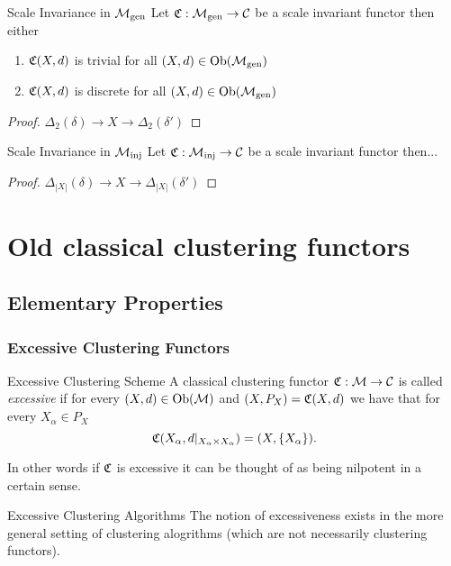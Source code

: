 \begin{proposition}{Scale Invariance in ${\mathcal{M}_\mathrm{gen}}$}{}
    Let $\mathfrak{C}: {\mathcal{M}_\mathrm{gen}} \to \mathcal{C}$ be a scale invariant functor then either
    \begin{enumerate}
        \item $\mathfrak{C}(X,d)$ is trivial for all $(X,d) \in \mathrm {Ob}({\mathcal{M}_\mathrm{gen}})$
        \item $\mathfrak{C}(X,d)$ is discrete for all $(X,d) \in \mathrm {Ob}({\mathcal{M}_\mathrm{gen}})$
    \end{enumerate}
\end{proposition}

\begin{proof}
    $\Delta_2(\delta) \to X \to \Delta_2(\delta')$
\end{proof}

\begin{proposition}{Scale Invariance in ${\mathcal{M}_\mathrm{inj}}$}{}
    Let $\mathfrak{C}: {\mathcal{M}_\mathrm{inj}} \to \mathcal{C}$ be a scale invariant functor then...
\end{proposition}

\begin{proof}
    $\Delta_{|X|}(\delta) \to X \to \Delta_{|X|}(\delta')$
\end{proof}


\chapter*{Old classical clustering functors}


\section{Elementary Properties}
\subsection{Excessive Clustering Functors}
\begin{definition}{Excessive Clustering Scheme}{}
A classical clustering functor $\mathfrak{C}: \mathcal{M} \to \mathcal{C}$ is called \emph{excessive} if for every $(X,d) \in \mathrm {Ob}(\mathcal{M})$ and $(X,P_X) = \mathfrak{C}(X,d)$ we have that for every $X_\alpha \in P_X$
\begin{equation*}
    \mathfrak{C}(X_\alpha, d|_{X_\alpha \times X_\alpha}) = (X,\{X_\alpha\}).
\end{equation*}
\end{definition}
In other words if $\mathfrak{C}$ is excessive it can be thought of as being nilpotent in a certain sense.

\begin{myremark}{Excessive Clustering Algorithms}{}
The notion of excessiveness exists in the more general setting of clustering alogrithms (which are not necessarily clustering functors).
\end{myremark}

